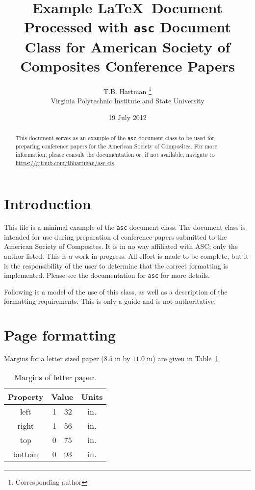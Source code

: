 \documentclass[]{asc}
\begin{document}
\title{Example \LaTeX\ Document Processed with \texttt{asc} Document Class for American Society of Composites Conference Papers}
\author{T.B. Hartman \thanks{Corresponding author} \\ Virginia Polytechnic Institute and State University}
\date{19 July 2012}

\maketitle

\begin{abstract}
    This document serves as an example of the \texttt{asc} document class to be used for preparing conference papers for the American Society of Composites.
    For more information, please consult the documentation or, if not available, navigate to \url{https://github.com/tbhartman/asc-cls}.
\end{abstract}

\section*{Introduction}

This file is a minimal example of the \texttt{asc} document class.
The document class is intended for use during preparation of conference papers submitted to the American Society of Composites.
It is in no way affiliated with ASC; only the author listed.
This is a work in progress.
All effort is made to be complete, but it is the responsibility of the user to determine that the correct formatting is implemented.
Please see the documentation for \texttt{asc} for more details.

Following is a model of the use of this class, as well as a description of the formatting requirements.
This is only a guide and is not authoritative.

\section*{Page formatting}

Margins for a letter sized paper ($8.5 \text{~in}$ by $11.0 \text{~in}$) are given in Table~\ref{tab:margins}
\begin{table}
    \centering
    \caption{Margins of letter paper.}
    \begin{tabular}{|c|r@{.}l|c|}
        \hline
        Property & \multicolumn{2}{|c|}{Value} & Units \\
        \hline \hline
        left   & 1&32 & in. \\
        right  & 1&56 & in. \\
        top    & 0&75 & in. \\
        bottom & 0&93 & in. \\
        \hline
    \end{tabular}
    \label{tab:margins}
\end{table}
\end{document}
